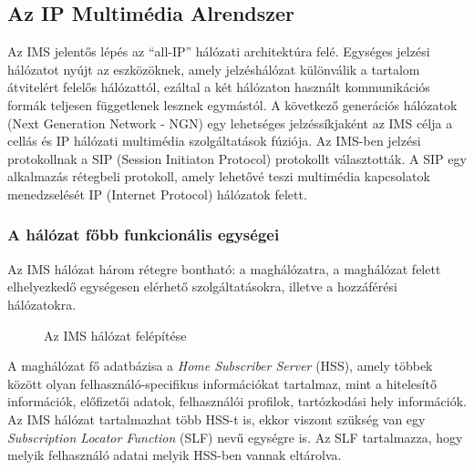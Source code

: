 \subsection{Az IP Multimédia Alrendszer}
\label{sec:ims}

Az IMS jelentős lépés az ``all-IP'' hálózati architektúra felé. Egységes jelzési hálózatot nyújt az eszközöknek, amely jelzéshálózat különválik a tartalom átvitelért felelős hálózattól, ezáltal a két hálózaton használt kommunikációs formák teljesen függetlenek lesznek egymástól. A következő generációs hálózatok (Next Generation Network - NGN) egy lehetséges jelzéssíkjaként az IMS célja a cellás és IP hálózati multimédia szolgáltatások fúziója. Az IMS-ben jelzési protokollnak a  SIP (Session Initiaton Protocol) protokollt választották. A SIP egy alkalmazás rétegbeli protokoll, amely lehetővé teszi multimédia kapcsolatok menedzselését IP (Internet Protocol) hálózatok felett. 

\subsubsection{A hálózat főbb funkcionális egységei}

Az IMS hálózat három rétegre bontható: a maghálózatra, a maghálózat felett elhelyezkedő egységesen elérhető szolgáltatásokra, illetve a hozzáférési hálózatokra.

\begin{figure}[htbp]
\center
{}
\caption{Az IMS hálózat felépítése~\cite{ims_figure} }
\label{fig:model}
\end{figure}


A maghálózat fő adatbázisa a \emph{Home Subscriber Server} (HSS), amely többek között olyan felhasználó-specifikus információkat tartalmaz, mint a hitelesítő információk, előfizetői adatok, felhasználói profilok, tartózkodási hely információk. Az IMS hálózat tartalmazhat több HSS-t is, ekkor viszont szükség van egy \emph{Subscription Locator Function} (SLF) nevű egységre is. Az SLF tartalmazza, hogy melyik felhasználó adatai melyik HSS-ben vannak eltárolva.

